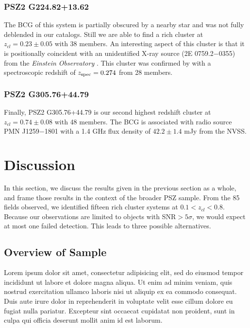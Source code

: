 \documentclass[apj, revtex4-1]{emulateapj}
\begin{document}
\subsubsection{PSZ2 G224.82+13.62} %
The BCG of this system is partially obscured by a nearby star and was not fully deblended in our catalogs. Still we are able to find a rich cluster at $z_{cl} = 0.23 \pm 0.05$ with 38 members. An interesting aspect of this cluster is that it is positionally coincident with an unidentified X-ray source (2E 0759.2$-$0355) from the {\it Einstein Observatory} \citep{Harris1990}. This cluster was confirmed by \cite{Barrena2018} with a spectroscopic redshift of $z_{\rm spec} = 0.274$ from 28 members.

\subsubsection{PSZ2 G305.76+44.79} %
Finally, PSZ2 G305.76+44.79 is our second highest redshift cluster at $z_{cl} = 0.74 \pm 0.08$ with 48 members. The BCG is associated with radio source PMN J1259$-$1801 with a 1.4 GHz flux density of $42.2\pm 1.4$ mJy from the NVSS.


\section{Discussion}\label{sec:discussion}
In this section, we discuss the results given in the previous section as a whole, and frame those results in the context of the broader PSZ sample. From the 85 fields observed, we identified fifteen rich cluster systems at $0.1 < z_{cl} < 0.8$. Because our observations are limited to objects with SNR$>5\sigma$, we would expect at most one failed detection. This leads to three possible alternatives.

\subsection{Overview of Sample}
Lorem ipsum dolor sit amet, consectetur adipisicing elit, sed do eiusmod tempor incididunt ut labore et dolore magna aliqua. Ut enim ad minim veniam, quis nostrud exercitation ullamco laboris nisi ut aliquip ex ea commodo consequat. Duis aute irure dolor in reprehenderit in voluptate velit esse cillum dolore eu fugiat nulla pariatur. Excepteur sint occaecat cupidatat non proident, sunt in culpa qui officia deserunt mollit anim id est laborum.
\end{document}
